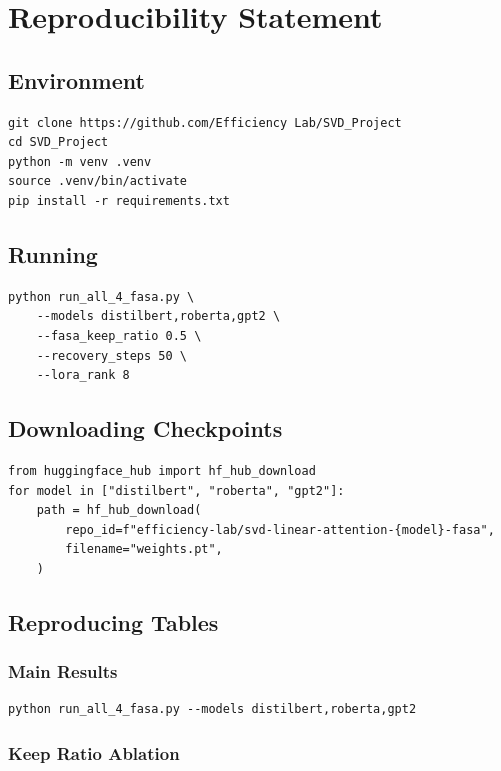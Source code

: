 
\section{Reproducibility Statement}

\subsection{Environment}

\begin{lstlisting}
git clone https://github.com/Efficiency Lab/SVD_Project
cd SVD_Project
python -m venv .venv
source .venv/bin/activate
pip install -r requirements.txt
\end{lstlisting}

\subsection{Running}

\begin{lstlisting}
python run_all_4_fasa.py \
    --models distilbert,roberta,gpt2 \
    --fasa_keep_ratio 0.5 \
    --recovery_steps 50 \
    --lora_rank 8
\end{lstlisting}

\subsection{Downloading Checkpoints}

\begin{lstlisting}
from huggingface_hub import hf_hub_download
for model in ["distilbert", "roberta", "gpt2"]:
    path = hf_hub_download(
        repo_id=f"efficiency-lab/svd-linear-attention-{model}-fasa",
        filename="weights.pt",
    )
\end{lstlisting}

\subsection{Reproducing Tables}

\subsubsection{Main Results}

\begin{lstlisting}
python run_all_4_fasa.py --models distilbert,roberta,gpt2
\end{lstlisting}

\subsubsection{Keep Ratio Ablation}

